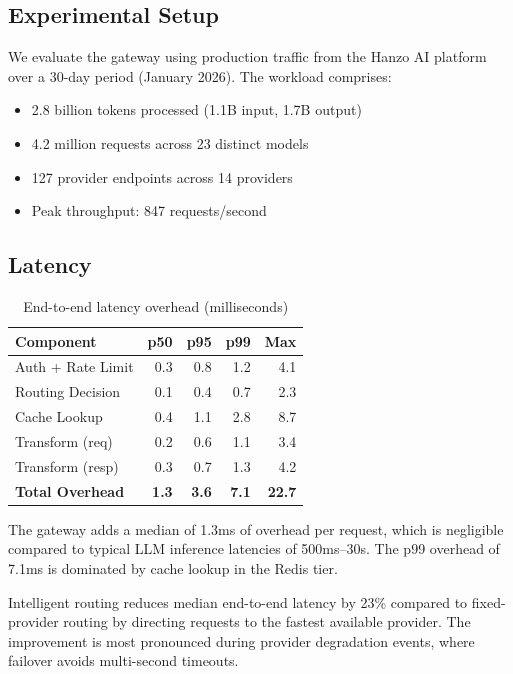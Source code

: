 \documentclass[11pt,twocolumn]{article}
\begin{document}
\subsection{Experimental Setup}

We evaluate the gateway using production traffic from the Hanzo AI platform over a 30-day period (January 2026). The workload comprises:

\begin{itemize}[leftmargin=*]
    \item 2.8 billion tokens processed (1.1B input, 1.7B output)
    \item 4.2 million requests across 23 distinct models
    \item 127 provider endpoints across 14 providers
    \item Peak throughput: 847 requests/second
\end{itemize}

\subsection{Latency}

\begin{table}[t]
\centering
\caption{End-to-end latency overhead (milliseconds)}
\label{tab:latency}
\begin{tabular}{@{}lrrrr@{}}
\toprule
\textbf{Component} & \textbf{p50} & \textbf{p95} & \textbf{p99} & \textbf{Max} \\
\midrule
Auth + Rate Limit & 0.3 & 0.8 & 1.2 & 4.1 \\
Routing Decision & 0.1 & 0.4 & 0.7 & 2.3 \\
Cache Lookup & 0.4 & 1.1 & 2.8 & 8.7 \\
Transform (req) & 0.2 & 0.6 & 1.1 & 3.4 \\
Transform (resp) & 0.3 & 0.7 & 1.3 & 4.2 \\
\midrule
\textbf{Total Overhead} & \textbf{1.3} & \textbf{3.6} & \textbf{7.1} & \textbf{22.7} \\
\bottomrule
\end{tabular}
\end{table}

The gateway adds a median of 1.3ms of overhead per request, which is negligible compared to typical LLM inference latencies of 500ms--30s. The p99 overhead of 7.1ms is dominated by cache lookup in the Redis tier.

Intelligent routing reduces median end-to-end latency by 23\% compared to fixed-provider routing by directing requests to the fastest available provider. The improvement is most pronounced during provider degradation events, where failover avoids multi-second timeouts.
\end{document}
